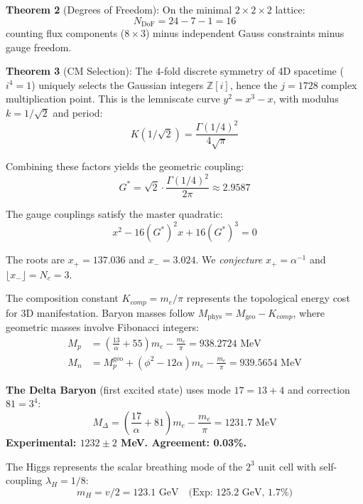 \documentclass[aps,prl,twocolumn,10pt,groupedaddress,nopacs]{revtex4}
\begin{document}
\textbf{Theorem 2} (Degrees of Freedom): On the minimal $2 \times 2 \times 2$ lattice:
\begin{equation}
N_{\text{DoF}} = 24 - 7 - 1 = 16
\end{equation}
counting flux components ($8 \times 3$) minus independent Gauss constraints minus gauge freedom.

\textbf{Theorem 3} (CM Selection): The 4-fold discrete symmetry of 4D spacetime ($i^4 = 1$) uniquely selects the Gaussian integers $\mathbb{Z}[i]$, hence the $j = 1728$ complex multiplication point. This is the lemniscate curve $y^2 = x^3 - x$, with modulus $k = 1/\sqrt{2}$ and period:
\begin{equation}
K(1/\sqrt{2}) = \frac{\Gamma(1/4)^2}{4\sqrt{\pi}}
\end{equation}

Combining these factors yields the geometric coupling:
\begin{equation}
G^* = \sqrt{2} \cdot \frac{\Gamma(1/4)^2}{2\pi} \approx 2.9587
\end{equation}

The gauge couplings satisfy the master quadratic:
\begin{equation}
x^2 - 16(G^*)^2 x + 16(G^*)^3 = 0
\end{equation}

The roots are $x_+ = 137.036$ and $x_- = 3.024$. We \textit{conjecture} $x_+ = \alpha^{-1}$ and $\lfloor x_- \rfloor = N_c = 3$.

The composition constant $K_{comp} = m_e/\pi$ represents the topological energy cost for 3D manifestation. Baryon masses follow $M_{\text{phys}} = M_{\text{geo}} - K_{comp}$, where geometric masses involve Fibonacci integers:
\begin{align}
M_p &= \left(\frac{13}{\alpha} + 55\right)m_e - \frac{m_e}{\pi} = 938.2724 \text{ MeV} \\
M_n &= M_p^{\text{geo}} + (\phi^2 - 12\alpha)m_e - \frac{m_e}{\pi} = 939.5654 \text{ MeV}
\end{align}

\textbf{The Delta Baryon} (first excited state) uses mode $17 = 13 + 4$ and correction $81 = 3^4$:
\begin{equation}
M_\Delta = \left(\frac{17}{\alpha} + 81\right)m_e - \frac{m_e}{\pi} = 1231.7 \text{ MeV}
\end{equation}
\textbf{Experimental: $1232 \pm 2$ MeV. Agreement: 0.03\%.}

The Higgs represents the scalar breathing mode of the $2^3$ unit cell with self-coupling $\lambda_H = 1/8$:
\begin{equation}
m_H = v/2 = 123.1 \text{ GeV} \quad \text{(Exp: 125.2 GeV, 1.7\%)}
\end{equation}
\end{document}
